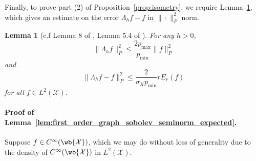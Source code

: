 \documentclass[twoside]{article}
\newcommand{\1}{\mathbf{1}}
\newcommand{\Xset}{\mathcal{X}}
\newcommand{\Leb}{L}
\newtheorem{lemma}{Lemma}
\theoremstyle{definition}
\theoremstyle{remark}
\begin{document}
Finally, to prove part (2) of Proposition~\ref{prop:isometry}, we require Lemma~\ref{lem:smoothening_error}, which gives an estimate on the error $\Lambda_h f - f$ in $\|\cdot\|_P^2$ norm.
\begin{lemma}[c.f Lemma 8 of \cite{trillos2019}, Lemma 5.4 of \cite{burago2014}]
	\label{lem:smoothening_error}
	For any $h > 0$, 
	\begin{equation}
	\label{eqn:smoothening_error_norm}
	\bigl\|\Lambda_hf\bigr\|_{P}^2 \leq \frac{2p_{\max}}{p_{\min}} \bigl\|f\bigr\|_{P}^2
	\end{equation}
	and
	\begin{equation}
	\label{eqn:smoothening_error_energy}
	\bigl\|\Lambda_hf - f\bigr\|_{P}^2 \leq \frac{2}{\sigma_Kp_{\min}} r E_r(f)
	\end{equation}
	for all $f \in \Leb^2(\Xset)$.
\end{lemma}

\paragraph{Proof of Lemma~\ref{lem:first_order_graph_sobolev_seminorm_expected}.}
Suppose $f \in C^{\infty}(\wb{\Xset})$, which we may do without loss of generality due to the density of $C^{\infty}(\wb{\Xset})$ in  $\Leb^2(\Xset)$.
\end{document}
